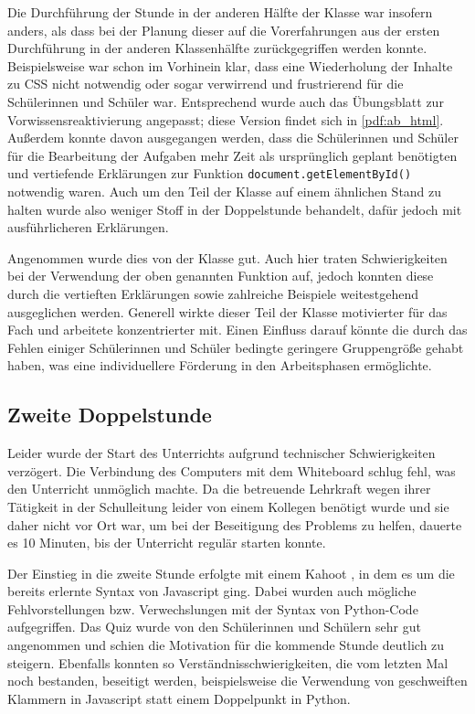 Die Durchführung der Stunde in der anderen Hälfte der Klasse war insofern anders, als dass bei der Planung dieser auf die Vorerfahrungen aus der ersten Durchführung in der anderen Klassenhälfte zurückgegriffen werden konnte.
Beispielsweise war schon im Vorhinein klar, dass eine Wiederholung der Inhalte zu CSS nicht notwendig oder sogar verwirrend und frustrierend für die Schülerinnen und Schüler war.
Entsprechend wurde auch das Übungsblatt zur Vorwissensreaktivierung angepasst; diese Version findet sich in \autoref{pdf:ab_html}.
Außerdem konnte davon ausgegangen werden, dass die Schülerinnen und Schüler für die Bearbeitung der Aufgaben mehr Zeit als ursprünglich geplant benötigten und vertiefende Erklärungen zur Funktion \texttt{document.getElementById()} notwendig waren.
Auch um den Teil der Klasse auf einem ähnlichen Stand zu halten wurde also weniger Stoff in der Doppelstunde behandelt, dafür jedoch mit ausführlicheren Erklärungen.

Angenommen wurde dies von der Klasse gut.
Auch hier traten Schwierigkeiten bei der Verwendung der oben genannten Funktion auf, jedoch konnten diese durch die vertieften Erklärungen sowie zahlreiche Beispiele weitestgehend ausgeglichen werden.
Generell wirkte dieser Teil der Klasse motivierter für das Fach und arbeitete konzentrierter mit.
Einen Einfluss darauf könnte die durch das Fehlen einiger Schülerinnen und Schüler bedingte geringere Gruppengröße gehabt haben, was eine individuellere Förderung in den Arbeitsphasen ermöglichte.


\subsection{Zweite Doppelstunde}
\label{subsec:doppelstunde-2}

Leider wurde der Start des Unterrichts aufgrund technischer Schwierigkeiten verzögert.
Die Verbindung des Computers mit dem Whiteboard schlug fehl, was den Unterricht unmöglich machte.
Da die betreuende Lehrkraft wegen ihrer Tätigkeit in der Schulleitung leider von einem Kollegen benötigt wurde und sie daher nicht vor Ort war, um bei der Beseitigung des Problems zu helfen, dauerte es 10 Minuten, bis der Unterricht regulär starten konnte.

Der Einstieg in die zweite Stunde erfolgte mit einem Kahoot \cite{wang2020kahoot, dellos2015kahoot}, in dem es um die bereits erlernte Syntax von Javascript ging.
Dabei wurden auch mögliche Fehlvorstellungen bzw. Verwechslungen mit der Syntax von Python-Code aufgegriffen.
Das Quiz wurde von den Schülerinnen und Schülern sehr gut angenommen und schien die Motivation für die kommende Stunde deutlich zu steigern.
Ebenfalls konnten so Verständnisschwierigkeiten, die vom letzten Mal noch bestanden, beseitigt werden, beispielsweise die Verwendung von geschweiften Klammern in Javascript statt einem Doppelpunkt in Python.

